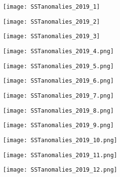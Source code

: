 \documentclass[11pt,a4paper,svgnames,draft]{beamer}
\newlength{\figwidth}
\begin{document}
\begin{tcbitemize}[raster columns=3,raster rows=4,raster height=1.2\linewidth,raster equal height,
raster every box/.style={size=normal,beamer,colbacktitle=myblue,colframe=myblue,colback=black,center title,fonttitle=\huge\cloudfont,toptitle=2mm,opacitybacktitle=.5}]

\tcbitem[title=January\vphantom{JMly}] \begin{figure}\centering\texttt{[image: SSTanomalies\_2019\_1]}\end{figure}
\tcbitem[title=February\vphantom{JMly}]\begin{figure}\centering\texttt{[image: SSTanomalies\_2019\_2]}\end{figure}
\tcbitem[title=March\vphantom{JMly}] \begin{figure}\centering\texttt{[image: SSTanomalies\_2019\_3]}\end{figure}
	
\tcbitem[title=April\vphantom{JMly}] \begin{figure}\centering\texttt{[image: SSTanomalies\_2019\_4.png]}\end{figure}
\tcbitem[title=May\vphantom{JMly}] \begin{figure}\centering\texttt{[image: SSTanomalies\_2019\_5.png]}\end{figure}
\tcbitem[title=June\vphantom{JMly}] \begin{figure}\centering\texttt{[image: SSTanomalies\_2019\_6.png]}\end{figure}

\tcbitem[title=July\vphantom{JMly}] \begin{figure}\centering\texttt{[image: SSTanomalies\_2019\_7.png]} \end{figure}
\tcbitem[title=August\vphantom{JMly}] \begin{figure}\centering\texttt{[image: SSTanomalies\_2019\_8.png]} \end{figure}
\tcbitem[title=September\vphantom{JMly}] \begin{figure}\centering\texttt{[image: SSTanomalies\_2019\_9.png]} \end{figure}

\tcbitem[title=October\vphantom{JMly}] \begin{figure}\centering\texttt{[image: SSTanomalies\_2019\_10.png]}\end{figure}
\tcbitem[title=November\vphantom{JMly}] \begin{figure}\centering\texttt{[image: SSTanomalies\_2019\_11.png]} \end{figure}
\tcbitem[title=December\vphantom{JMly}] \begin{figure}\centering\texttt{[image: SSTanomalies\_2019\_12.png]} \end{figure}
\end{tcbitemize}
\end{document}
